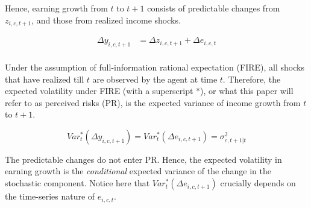 Hence, earning growth from \(t\) to \(t+1\) consists of predictable changes from
$z_{i,c,t+1}$, and those from realized income shocks.

\begin{equation}
\begin{split}
\label{Eq:IncProcess1}
\Delta y_{i,c,t+1} & =  \Delta z_{i,c,t+1} + \Delta e_{i,c,t} \\
\end{split}
\end{equation}

Under the assumption of full-information rational expectation (FIRE), all shocks that have realized till \(t\) are observed by the agent at
time \(t\). Therefore, the expected volatility under FIRE (with a superscript $*$), or what this paper will refer to as perceived risks (PR), is the expected
variance of income growth from \(t\) to \(t+1\).

\begin{equation}
Var_{t}^*(\Delta y_{i,c,t+1}) =Var_{t}^*(\Delta e_{i,c,t+1}) =\sigma^2_{c,t+1|t}
\end{equation}

The predictable changes do not enter PR. Hence, the expected volatility in earning growth is the \emph{conditional} expected variance of the change in the stochastic component. Notice here that $Var_{t}^*(\Delta e_{i,c,t+1})$ crucially depends on the time-series nature of $e_{i,c,t}$.



\begin{comment}
Under FIRE, there are a number of testable predictions about the patterns of
perceived risks.

\begin{itemize}
\item
  \textbf{No within-group disagreement}. First, agents who share the same income process have no disagreements
  on perceived risks. This can be checked by comparing
  within-cohort/group dispersion in perceived risks.
\item
  \textbf{State-independence}. Second, the perceived risks under such the assumed process above are
  not dependent on past/recent income realizations. To put it differently, there is no correlation between realized shocks and the perceived risks. This can be tested
  by estimating the correlation between perceived risks and past income
  realizations or their proxies if the latter is not directly observed. 
\item
  \textbf{Correct decomposition}. Third, under the assumed progress, the variances of permanent and transitory
  shocks enter perceived risks with loading of 1.
\end{itemize}

\end{comment}

